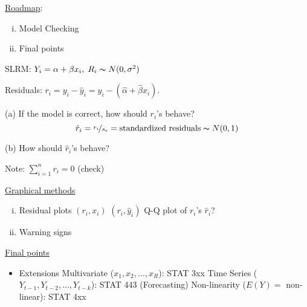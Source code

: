 \underline{Roadmap}:
\begin{enumerate}[(i)]
    \item Model Checking
    \item Final points
\end{enumerate}
SLRM: $ Y_i = \alpha+\beta x_i,\; R_i \thicksim N(0,\sigma^2) $

Residuals: $ r_i=y_i-\hat{y}_i=y_i-(\hat{\alpha}+\hat{\beta}x_i) $.

(a) If the model is correct, how should $ r_i $'s behave?
\[ \hat{r}_i=\nicefrac{r_i}{s_e}=\text{standardized residuals}
    \thicksim N(0,1) \]

(b) How should $ \hat{r}_i $'s behave?

Note: $ \sum\limits_{i=1}^{n} r_i=0 $ (check)

\underline{Graphical methods}
\begin{enumerate}[(i)]
    \item Residual plots
          \subitem $ (r_i,x_i) $
          \subitem $ (r_i,\hat{y}_i) $
          \subitem Q-Q plot of $ r_i $'s
          \subitem $ \hat{r}_i $?
    \item Warning signs
\end{enumerate}
\underline{Final points}
\begin{itemize}
    \item Extensions
          \subitem Multivariate ($ x_1,x_2,\ldots ,x_R $): STAT 3xx
          \subitem Time Series ($ Y_{t-1},Y_{t-2},\ldots ,Y_{t-k} $): STAT 443 (Forecasting)
          \subitem Non-linearity ($ E(Y)= $ non-linear): STAT 4xx
\end{itemize}
